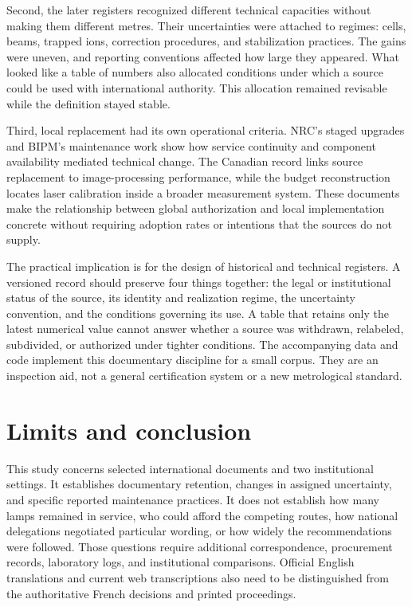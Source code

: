 \documentclass[11pt,a4paper]{article}
\begin{document}
Second, the later registers recognized different technical capacities without making them different metres. Their uncertainties were attached to regimes: cells, beams, trapped ions, correction procedures, and stabilization practices. The gains were uneven, and reporting conventions affected how large they appeared. What looked like a table of numbers also allocated conditions under which a source could be used with international authority. This allocation remained revisable while the definition stayed stable.

Third, local replacement had its own operational criteria. NRC's staged upgrades and BIPM's maintenance work show how service continuity and component availability mediated technical change. The Canadian record links source replacement to image-processing performance, while the budget reconstruction locates laser calibration inside a broader measurement system. These documents make the relationship between global authorization and local implementation concrete without requiring adoption rates or intentions that the sources do not supply.

The practical implication is for the design of historical and technical registers. A versioned record should preserve four things together: the legal or institutional status of the source, its identity and realization regime, the uncertainty convention, and the conditions governing its use. A table that retains only the latest numerical value cannot answer whether a source was withdrawn, relabeled, subdivided, or authorized under tighter conditions. The accompanying data and code implement this documentary discipline for a small corpus. They are an inspection aid, not a general certification system or a new metrological standard.

\section{Limits and conclusion}
This study concerns selected international documents and two institutional settings. It establishes documentary retention, changes in assigned uncertainty, and specific reported maintenance practices. It does not establish how many lamps remained in service, who could afford the competing routes, how national delegations negotiated particular wording, or how widely the recommendations were followed. Those questions require additional correspondence, procurement records, laboratory logs, and institutional comparisons. Official English translations and current web transcriptions also need to be distinguished from the authoritative French decisions and printed proceedings.
\end{document}
